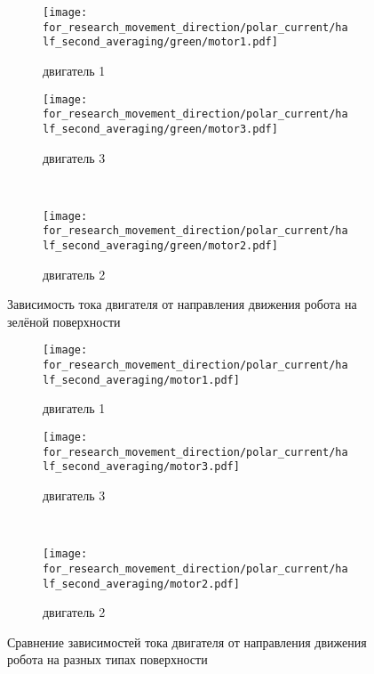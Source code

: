 \begin{figure}[H]
    \centering
    \begin{subfigure}{0.49\textwidth}
        \centering
        \texttt{[image: for\_research\_movement\_direction/polar\_current/half\_second\_averaging/green/motor1.pdf]}
        \caption{двигатель 1}
    \end{subfigure}
    \hspace{0.005\textwidth}
    \begin{subfigure}{0.49\textwidth}
        \centering
        \texttt{[image: for\_research\_movement\_direction/polar\_current/half\_second\_averaging/green/motor3.pdf]}
        \caption{двигатель 3}
    \end{subfigure} \\
    \vspace{4pt}
    \centering
    \begin{subfigure}{0.49\textwidth}
        \centering
        \texttt{[image: for\_research\_movement\_direction/polar\_current/half\_second\_averaging/green/motor2.pdf]}
        \caption{двигатель 2}
    \end{subfigure}
    \caption{Зависимость тока двигателя от направления движения робота на зелёной поверхности}
\end{figure}

\begin{figure}[H]
    \centering
    \begin{subfigure}{0.49\textwidth}
        \centering
        \texttt{[image: for\_research\_movement\_direction/polar\_current/half\_second\_averaging/motor1.pdf]}
        \caption{двигатель 1}
    \end{subfigure}
    \hspace{0.005\textwidth}
    \begin{subfigure}{0.49\textwidth}
        \centering
        \texttt{[image: for\_research\_movement\_direction/polar\_current/half\_second\_averaging/motor3.pdf]}
        \caption{двигатель 3}
    \end{subfigure} \\
    \vspace{4pt}
    \centering
    \begin{subfigure}{0.49\textwidth}
        \centering
        \texttt{[image: for\_research\_movement\_direction/polar\_current/half\_second\_averaging/motor2.pdf]}
        \caption{двигатель 2}
    \end{subfigure}
    \caption{Сравнение зависимостей тока двигателя от направления движения робота на разных типах поверхности}
\end{figure}

